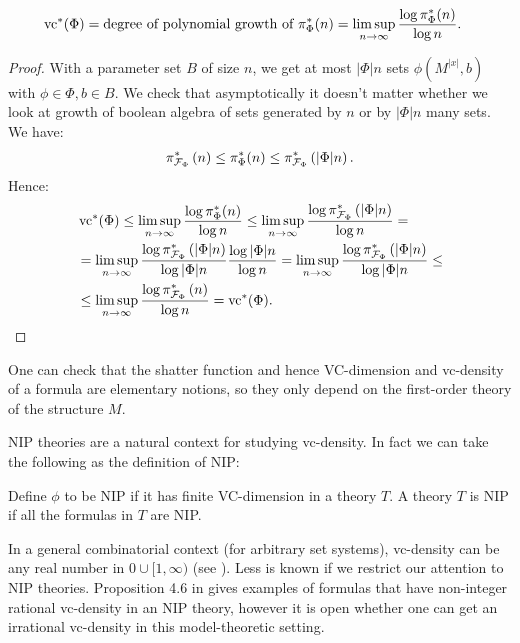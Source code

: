 \begin{Lemma} \label{count_types}
  \begin{align*}
    \operatorname{vc}^*(\Phi) &= \text{degree of polynomial growth of $\pi^*_\Phi(n)$}  = \limsup_{n \to \infty}\frac{\log \pi^*_\Phi(n)}{\log n}.
  \end{align*}  
\end{Lemma}

\begin{proof}
  With a parameter set $B$ of size $n$, we get at most $|\Phi|n$ sets $\phi(M^{|x|}, b)$ with $\phi \in \Phi, b \in B$.
  We check that asymptotically it doesn't matter whether we look at growth of boolean algebra of sets generated by
  $n$ or by $|\Phi|n$ many sets.
  We have:
  \begin{align*}
    \pi^*_{\mathcal F_\Phi}\left(n\right) \leq \pi^*_\Phi(n) \leq \pi^*_{\mathcal F_\Phi}\left(|\Phi|n\right).
  \end{align*}
  Hence:
  \begin{align*}
    &\operatorname{vc}^*(\Phi) \leq \limsup_{n \to \infty}\frac{\log \pi^*_\Phi(n)}{\log n} \leq \limsup_{n \to \infty}\frac{\log \pi^*_{\mathcal F_\Phi}\left(|\Phi|n\right)}{\log n} = \\
    & = \limsup_{n \to \infty}\frac{\log \pi^*_{\mathcal F_\Phi}\left(|\Phi|n\right)}{\log |\Phi|n} \frac{\log |\Phi|n}{\log n} =
      \limsup_{n \to \infty}\frac{\log \pi^*_{\mathcal F_\Phi}\left(|\Phi|n\right)}{\log |\Phi|n} \leq \\
    &\leq \limsup_{n \to \infty}\frac{\log \pi^*_{\mathcal F_\Phi}\left(n\right)}{\log n} = \operatorname{vc}^*(\Phi).
  \end{align*}
\end{proof} 

One can check that the shatter function and hence VC-dimension and vc-density of a formula are elementary notions,
so they only depend on the first-order theory of the structure $M$.

NIP theories are a natural context for studying vc-density.
In fact we can take the following as the definition of NIP:
\begin{Definition}
  Define $\phi$ to be NIP if it has finite VC-dimension in a theory $T$.
  A theory $T$ is NIP if all the formulas in $T$ are NIP.
\end{Definition}

In a general combinatorial context (for arbitrary set systems),
vc-density can be any real number in $0 \cup [1, \infty)$ (see \cite{ash8}).
Less is known if we restrict our attention to NIP theories.
Proposition 4.6 in \cite{density} gives examples of formulas that have non-integer rational vc-density in an NIP theory,
however it is open whether one can get an irrational vc-density in this model-theoretic setting.

